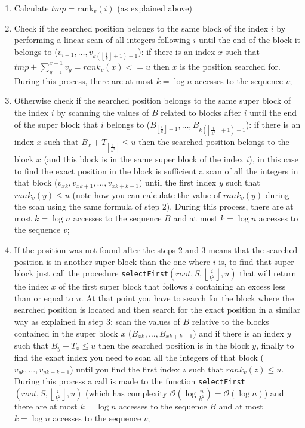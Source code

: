 \documentclass{article}
\begin{document}
    \begin{enumerate}
        \item Calculate $\mathit{tmp} = \text{rank}_v(i)$ (as explained above)
        \item Check if the searched position belongs to the same block of the index $i$ by performing a linear scan of all integers following $i$ until the end of the block it belongs to ($v_{i+1},\dots,v_{k(\left\lfloor{\frac{i}{k}}\right\rfloor+1)-1}$): if there is an index $x$ such that $\mathit{tmp} + \sum_{y=i}^{x-1}v_y = \mathit{rank}_v(x) <= u$ then $x$ is the position searched for. During this process, there are at most $k=\log{n}$ accesses to the sequence $v$;
        \item Otherwise check if the searched position belongs to the same super block of the index $i$ by scanning the values of $B$ related to blocks after $i$ until the end of the super block that $i$ belongs to ($B_{\left\lfloor{\frac{i}{k}}\right\rfloor+1},\dots,B_{k(\left\lfloor{\frac{i}{k^2}}\right\rfloor+1)-1}$): if there is an index $x$ such that $B_x+T_{\left \lfloor{\frac{i}{k^2}}\right\rfloor} \leq u$ then the searched position belongs to the block $x$ (and this block is in the same super block of the index $i$), in this case to find the exact position in the block is sufficient a scan of all the integers in that block ($v_{xk},v_{xk+1},\dots,v_{xk+k-1}$) until the first index $y$ such that $\mathit{rank}_v(y) \leq u$ (note how you can calculate the value of $\mathit{rank}_v(y)$ during the scan using the same formula of step $2$). During this process, there are at most $k=\log{n}$ accesses to the sequence $B$ and at most $k=\log{n}$ accesses to the sequence $v$;
        \item If the position was not found after the steps $2$ and $3$ means that the searched position is in another super block than the one where $i$ is, to find that super block just call the procedure \texttt{selectFirst}$(\mathit{root},S,\left\lfloor{\frac{i}{k^2}}\right\rfloor,u)$ that will return the index $x$ of the first super block that follows $i$ containing an excess less than or equal to $u$. At that point you have to search for the block where the searched position is located and then search for the exact position in a similar way as explained in step $3$: scan the values of $B$ relative to the blocks contained in the super block $x$ ($B_{xk},\dots,B_{xk+k-1}$) and if there is an index $y$ such that $B_y+T_x \leq u$ then the searched position is in the block $y$, finally to find the exact index you need to scan all the integers of that block ($v_{yk},\dots,v_{yk+k-1}$) until you find the first index $z$ such that $\mathit{rank}_v(z) \leq u$. During this process a call is made to the function \texttt{selectFirst}$(\mathit{root},S,\left\lfloor{\frac{i}{k^2}}\right\rfloor,u)$ (which has complexity $\mathcal{O}(\log{\frac{n}{k^2}})=\mathcal{O}(\log{n})$) and there are at most $k=\log{n}$ accesses to the sequence $B$ and at most $k=\log{n}$ accesses to the sequence $v$;
    \end{enumerate}
\end{document}
